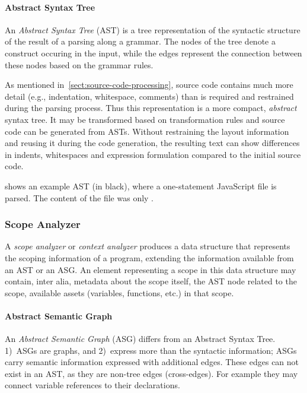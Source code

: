 \paragraph{Abstract Syntax Tree}
An \emph{Abstract Syntax Tree} (AST) is a tree representation of the syntactic structure of the result of a parsing along a grammar. The nodes of the tree denote a construct occuring in the input, while the edges represent the connection between these nodes based on the grammar rules.

As mentioned in~\cref{sect:source-code-processing}, source code contains much more detail (e.g., indentation, whitespace, comments) than is required and restrained during the parsing process. Thus this representation is a more compact, \emph{abstract} syntax tree. It may be transformed based on transformation rules and source code can be generated from ASTs. Without restraining the layout information and reusing it during the code generation, the resulting text can show differences in indents, whitespaces and expression formulation compared to the initial source code.

 shows an example AST (in black), where a one-statement JavaScript file is parsed. The content of the file was only .

\subsubsection{Scope Analyzer}
A \emph{scope analyzer} or \emph{context analyzer} produces a data structure that represents the scoping information of a program, extending the information available from an AST or an ASG. An element representing a scope in this data structure may contain, inter alia, metadata about the scope itself, the AST node related to the scope, available assets (variables, functions, etc.) in that scope.~\cite{shift-scope}

\paragraph{Abstract Semantic Graph}
An \emph{Abstract Semantic Graph} (ASG) differs from an Abstract Syntax Tree. 1)~ASGs are graphs, and 2)~express more than the syntactic information; ASGs carry semantic information expressed with additional edges. These edges can not exist in an AST, as they are non-tree edges (cross-edges). For example they may connect variable references to their declarations.~\cite{raghavan_dex:_2004}

